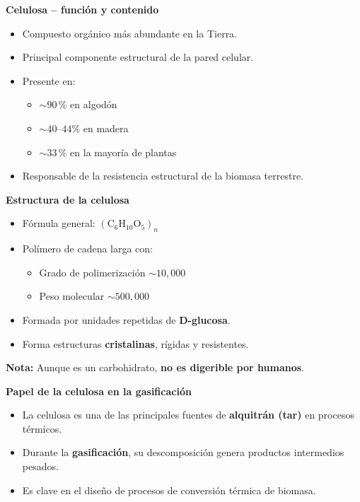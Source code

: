\documentclass[../../main.tex]{subfiles}
\begin{document}
\begin{frame}{\textbf{Celulosa – función y contenido}}
\begin{itemize}
  \item Compuesto orgánico más abundante en la Tierra.
  \item Principal componente estructural de la pared celular.
  \item Presente en:
  \begin{itemize}
    \item \( \sim 90\,\% \) en algodón
   \item \( \sim 40\text{--}44\% \) en madera
    \item \( \sim 33\,\% \) en la mayoría de plantas
  \end{itemize}
  \item Responsable de la resistencia estructural de la biomasa terrestre.
\end{itemize}
\end{frame}
\begin{frame}{\textbf{Estructura de la celulosa}}
\begin{itemize}
  \item Fórmula general: \( (\text{C}_6\text{H}_{10}\text{O}_5)_n \)
  \item Polímero de cadena larga con:
  \begin{itemize}
    \item Grado de polimerización \( \sim 10{,}000 \)
    \item Peso molecular \( \sim 500{,}000 \)
  \end{itemize}
  \item Formada por unidades repetidas de \textbf{D-glucosa}.
  \item Forma estructuras \textbf{cristalinas}, rígidas y resistentes.
\end{itemize}

\vspace{0.5em}
\textbf{Nota:} Aunque es un carbohidrato, \textbf{no es digerible por humanos}.
\end{frame}
\begin{frame}{\textbf{Papel de la celulosa en la gasificación}}
\begin{itemize}
  \item La celulosa es una de las principales fuentes de \textbf{alquitrán (tar)} en procesos térmicos.
  \item Durante la \textbf{gasificación}, su descomposición genera productos intermedios pesados.
  \item Es clave en el diseño de procesos de conversión térmica de biomasa.
\end{itemize}
\end{frame}
\end{document}
